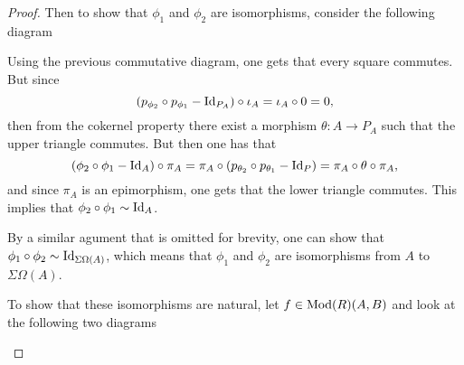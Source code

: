 \begin{proof}
    Then to show that \( \phi_1 \) and \( \phi_2 \) are isomorphisms, consider the following diagram
    \begin{center}
    \end{center}

    Using the previous commutative diagram, one gets that every square commutes. But since
    \[
        (p_{\phi_2} \circ p_{\phi_1} - \operatorname{Id}_{P_A}) \circ \iota_A = \iota_A \circ 0 = 0,
    \]
    then from the cokernel property there exist a morphism \( \theta: A \to P_A \) such that the upper triangle commutes. But then one has that
    \[
        (\phi_2 \circ \phi_1 - \operatorname{Id}_A) \circ \pi_A = \pi_A \circ (p_{\theta_2} \circ p_{\theta_1} - \operatorname{Id}_P) = \pi_A \circ \theta \circ \pi_A,
    \]
    and since \( \pi_A \) is an epimorphism, one gets that the lower triangle commutes. This implies that \( \phi_2 \circ \phi_1 \sim \operatorname{Id}_A \).
    
    By a similar agument that is omitted for brevity, one can show that \( \phi_1 \circ \phi_2 \sim \operatorname{Id}_{\Sigma\Omega(A)} \), which means that \( \phi_1 \) and \( \phi_2 \) are isomorphisms from \( A \) to \( \Sigma\Omega(A) \).

    To show that these isomorphisms are natural, let \( f \in \operatorname{Mod}(R)(A, B) \) and look at the following two diagrams
    \begin{center}
\end{center}
\end{proof}
